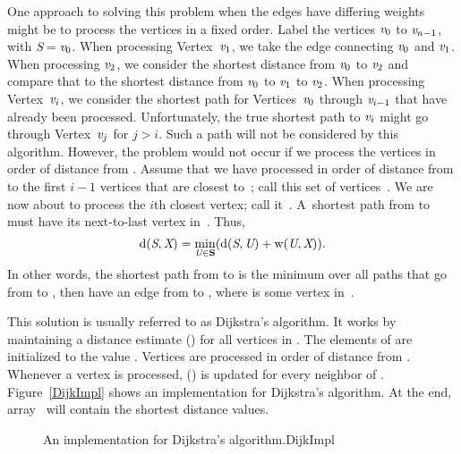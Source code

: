 One approach to solving this problem when the edges have
differing weights might be to process the
vertices in a fixed order.
Label the vertices \({\textit{v}}_0\) to \({\textit{v}}_{n-1}\), with
\({\textit{S}} = {\textit{v}}_0\).
When processing Vertex~\({\textit{v}}_1\), we take the edge connecting
\({\textit{v}}_0\) and \({\textit{v}}_1\).
When processing \({\textit{v}}_2\), we consider the shortest distance from
\({\textit{v}}_0\) to \({\textit{v}}_2\) and compare that to the shortest
distance from \({\textit{v}}_0\) to \({\textit{v}}_1\) to \({\textit{v}}_2\).
When processing Vertex~\({\textit{v}}_i\), we consider the shortest
path for Vertices~\({\textit{v}}_0\) through \({\textit{v}}_{i-1}\) that have
already been processed.
Unfortunately, the true shortest path to \({\textit{v}}_i\) might go
through Vertex~\({\textit{v}}_j\) for \(j > i\).
Such a path will not be considered by this algorithm.
However, the problem would not occur if we process the vertices in
order of distance from .
Assume that we have processed in order of distance from  to
the first \(i-1\) vertices that are closest to~; call this set
of vertices~.
We are now about to process the \(i\)th closest vertex; call it~.
A~shortest path from  to  must have its next-to-last
vertex in~. 
Thus,
\[{\rm d}({\textit{S}}, {\textit{X}}) =
\min_{{\textit{U}} \in {\textbf{S}}}({\rm d}({\textit{S}}, {\textit{U}})
+ {\rm w}({\textit{U}}, {\textit{X}})).\]
In other words, the shortest path from  to  is the
minimum over all paths that go from  to , then have an
edge from  to , where  is some vertex
in~.

This solution is usually referred to as Dijkstra's algorithm.
It works by maintaining a distance estimate
() for all vertices  in .
The elements of  are initialized to the value .
Vertices are processed in order of distance from .
Whenever a vertex  is processed, () is updated for
every neighbor  of .
Figure~\ref{DijkImpl} shows an implementation for Dijkstra's algorithm.
At the end, array~ will contain the shortest distance values.

\begin{figure}
\vspace{-\bigskipamount}\vspace{-\bigskipamount}
{An implementation for Dijkstra's algorithm.}{DijkImpl}\
\vspace{-\bigskipamount}
\end{figure}

